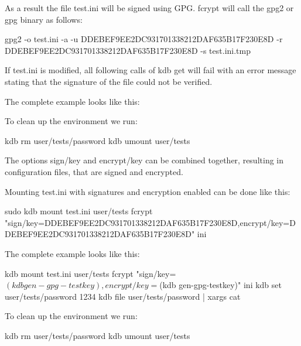 As a result the file {\ttfamily test.\+ini} will be signed using G\+PG. {\ttfamily fcrypt} will call the {\ttfamily gpg2} or {\ttfamily gpg} binary as follows\+:


\begin{DoxyCode}
gpg2 -o test.ini -a -u DDEBEF9EE2DC931701338212DAF635B17F230E8D -r DDEBEF9EE2DC931701338212DAF635B17F230E8D
       -s test.ini.tmp
\end{DoxyCode}


If {\ttfamily test.\+ini} is modified, all following calls of {\ttfamily kdb get} will fail with an error message stating that the signature of the file could not be verified.

The complete example looks like this\+:




To clean up the environment we run\+:


\begin{DoxyCode}
kdb rm user/tests/password
kdb umount user/tests
\end{DoxyCode}


The options {\ttfamily sign/key} and {\ttfamily encrypt/key} can be combined together, resulting in configuration files, that are signed and encrypted.

Mounting {\ttfamily test.\+ini} with signatures and encryption enabled can be done like this\+:


\begin{DoxyCode}
sudo kdb mount test.ini user/tests fcrypt
       "sign/key=DDEBEF9EE2DC931701338212DAF635B17F230E8D,encrypt/key=DDEBEF9EE2DC931701338212DAF635B17F230E8D" ini
\end{DoxyCode}


The complete example looks like this\+:


\begin{DoxyCode}
kdb mount test.ini user/tests fcrypt "sign/key=$(kdb gen-gpg-testkey),encrypt/key=$(kdb gen-gpg-testkey)"
       ini
kdb set user/tests/password 1234
kdb file user/tests/password | xargs cat
\end{DoxyCode}


To clean up the environment we run\+:


\begin{DoxyCode}
kdb rm user/tests/password
kdb umount user/tests
\end{DoxyCode}


